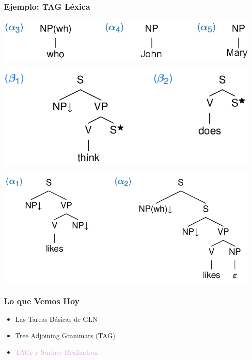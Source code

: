 \documentclass[compress,color=usenames]{beamer}
\newcommand{\mH}[1]{\textcolor{Plum}{#1}}
\begin{document}
\begin{frame}
\frametitle{Ejemplo: TAG L\'exica}

\begin{center}
\includegraphics[scale=.35]{pics/pic2-30.jpg} \pause
\medskip

\includegraphics[scale=.35]{pics/pic2-29.jpg} \pause
\medskip

\includegraphics[scale=.35]{pics/pic2-28.jpg}

\end{center}
\end{frame}




\begin{frame}
\frametitle{Lo que Vemos Hoy}

\begin{itemize}
\item Las Tareas B\'asicas de GLN
\item Tree Adjoining Grammars (TAG)
\item \mH{TAGs y Surface Realization}
\end{itemize}
\end{frame}
\end{document}
